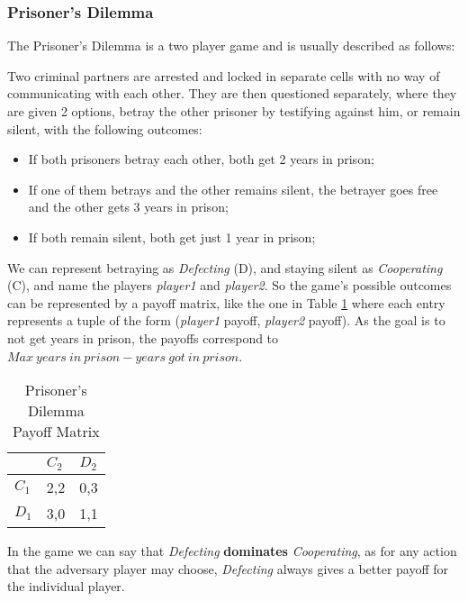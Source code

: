 \subsubsection{Prisoner's Dilemma}
\label{subsubsec:PrisonersDilemma}
The Prisoner's Dilemma is a two player game and is usually described as follows:

Two criminal partners are arrested and locked in separate cells with no way of communicating with each other. They are then questioned separately, where they are given 2 options, betray the other prisoner by testifying against him, or remain silent, with the following outcomes:
\begin{itemize}
	\item If both prisoners betray each other, both get 2 years in prison;
	\item If one of them betrays and the other remains silent, the betrayer goes free and the other gets 3 years in prison;
	\item If both remain silent, both get just 1 year in prison;
\end{itemize}

We can represent betraying as \textit{Defecting} (D), and staying silent as \textit{Cooperating} (C), and name the players \textit{player1} and \textit{player2}. So the game's possible outcomes can be represented by a payoff matrix, like the one in Table \ref{PrisonerDilemaPayoffMatrix} where each entry represents a tuple of the form (\textit{player1} payoff, \textit{player2} payoff). As the goal is to not get years in prison, the payoffs correspond to $Max\ years\ in\ prison - years\ got\ in\ prison$.

\begin{table}[]
	\centering
	\begin{tabular}{l|l|l|}
		\cline{2-3}
		& $C_2$   & $D_2$   \\ \hline
		\multicolumn{1}{|l|}{$C_1$} & 2,2 & 0,3 \\ \hline
		\multicolumn{1}{|l|}{$D_1$} & 3,0 & 1,1 \\ \hline
	\end{tabular}
	\caption{Prisoner's Dilemma Payoff Matrix}
	\label{PrisonerDilemaPayoffMatrix}
\end{table}	

In the game we can say that \textit{Defecting} \textbf{dominates} \textit{Cooperating}, as for any action that the adversary player may choose, \textit{Defecting} always gives a better payoff for the individual player\cite{Nash1951}.

